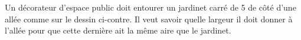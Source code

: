
\begin{exercice}\label{exosmath-0210}


    \begin{multicols}{2}

        Un décorateur d'espace public doit entourer un jardinet carré de \unit{5}{\meter} de côté d'une allée comme sur le dessin ci-contre. Il veut savoir quelle largeur il doit donner à l'allée pour que cette dernière ait la même aire que le jardinet.

        \columnbreak
        \begin{center}

        \end{center}
    \end{multicols}


\end{exercice}
